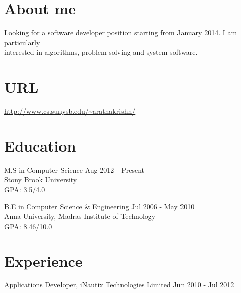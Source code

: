 \documentclass [margin] {res}
\begin{document}
 
 
 
\address{ 
rathakrishnanarun@gmail.com \\
https://github.com/r-arun  \\
        (631) 944-0302 
}
\address{Department of Computer Science \\ Stony Brook University \\ NY 11790 \\
         }

 
\begin{resume} 
\section{About me}
Looking for a software developer position starting from January 2014. I am particularly\\
interested in algorithms, problem solving and system software.
\section{URL}
\url{http://www.cs.sunysb.edu/~arathakrishn/}
\section{Education} 
M.S in Computer Science \hfill Aug 2012 - Present \\
Stony Brook University\\
GPA: 3.5/4.0 

B.E in Computer Science \& Engineering \hfill Jul 2006 - May 2010\\
Anna University, Madras Institute of Technology \\
GPA: 8.46/10.0
\section{Experience}
 Applications Developer, iNautix Technologies Limited \hfill Jun 2010 - Jul 2012
 

\end{resume}
\end{document}
